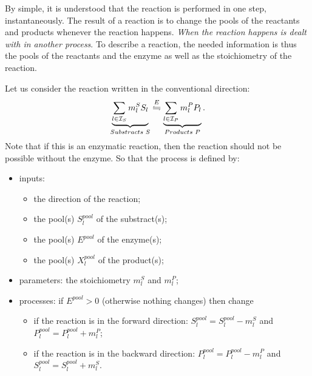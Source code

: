 By simple, it is understood that the reaction is performed in one step, instantaneously. The result of a reaction is to change the pools of the reactants and products whenever the reaction happens. {\em When the reaction happens is dealt with in another process}. To describe a reaction, the needed information is thus the pools of the reactants and the enzyme as well as the stoichiometry of the reaction.

\medskip

Let us consider the reaction written in the conventional direction:
$$
  \reaction{\underbrace{\sum_{l\in \mathcal{I}_S} m_{l}^SS_{l}}_{Substracts \text{ } S}}{\underbrace{\sum_{l\in\mathcal{I}_P}m_{l}^PP_l}_{Products \text{ } P}}{E}.
$$
Note that if this is an enzymatic reaction, then the reaction should not be possible without the enzyme. So that the process is defined by:
\begin{itemize}
  \item inputs:
  \begin{itemize}
    \item the direction of the reaction;
    \item the pool(s) $S_l^{pool}$ of the substract(s);
    \item the pool(s) $E^{pool}$ of the enzyme(s);
    \item the pool(s) $X_l^{pool}$ of the product(s);
  \end{itemize}
  \item parameters: the stoichiometry $m_{l}^S$ and $m_{l}^P$;
  \item processes: if $E^{pool}>0$ (otherwise nothing changes) then change
  \begin{itemize}
    \item if the reaction is in the forward direction: $S_l^{pool} = S_l^{pool} - m_{l}^S$ and $P_l^{pool} = P_l^{pool} + m_{l}^P$;
    \item if the reaction is in the backward direction: $P_l^{pool} = P_l^{pool} - m_{l}^P$ and $S_l^{pool} = S_l^{pool} + m_{l}^S$.
  \end{itemize}
\end{itemize}

\medskip

